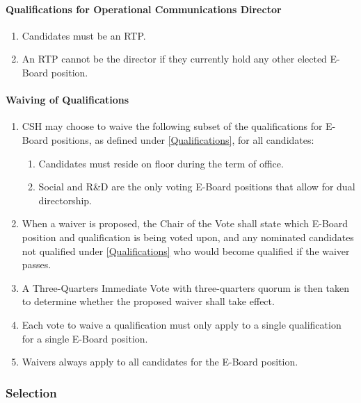 \documentclass{article}
\newcommand{\asubsection}[1]{\subsubsection{#1} \label{#1}}
\newcommand{\asubsubsection}[1]{\paragraph{#1} \label{#1}}
\begin{document}
\asubsubsection{Qualifications for Operational Communications Director}
\begin{enumerate}
	\item Candidates must be an RTP.
	\item An RTP cannot be the director if they currently hold any other elected E-Board position. %
\end{enumerate}

\asubsubsection{Waiving of Qualifications}
\begin{enumerate}
	\item CSH may choose to waive the following subset of the qualifications for E-Board positions, as defined under \ref{Qualifications}, for all candidates:
	      \begin{enumerate}
		      \item Candidates must reside on floor during the term of office.
		      \item Social and R\&D are the only voting E-Board positions that allow for dual directorship.
	      \end{enumerate}
	\item When a waiver is proposed, the Chair of the Vote shall state which E-Board position and qualification is being voted upon, and any nominated candidates not qualified under \ref{Qualifications} who would become qualified if the waiver passes.
	\item A Three-Quarters Immediate Vote with three-quarters quorum is then taken to determine whether the proposed waiver shall take effect.
	\item Each vote to waive a qualification must only apply to a single qualification for a single E-Board position.
	\item Waivers always apply to all candidates for the E-Board position.
\end{enumerate}

\asubsection{Selection}
\end{document}
